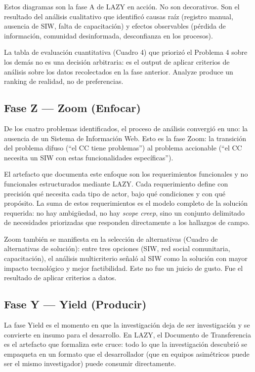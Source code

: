 \documentclass[14pt,a4paper,oneside]{extbook}
\begin{document}
Estos diagramas son la fase A de LAZY en acción. No son decorativos. Son el resultado del análisis cualitativo que identificó causas raíz (registro manual, ausencia de SIW, falta de capacitación) y efectos observables (pérdida de información, comunidad desinformada, desconfianza en los procesos).

La tabla de evaluación cuantitativa (Cuadro 4) que priorizó el Problema 4 sobre los demás no es una decisión arbitraria: es el output de aplicar criterios de análisis sobre los datos recolectados en la fase anterior. Analyze produce un ranking de realidad, no de preferencias.



\subsection{Fase Z — Zoom (Enfocar)}

De los cuatro problemas identificados, el proceso de análisis convergió en uno: la ausencia de un Sistema de Información Web. Esto es la fase Zoom: la transición del problema difuso (\enquote{el CC tiene problemas}) al problema accionable (\enquote{el CC necesita un SIW con estas funcionalidades específicas}).

El artefacto que documenta este enfoque son los requerimientos funcionales y no funcionales estructurados mediante LAZY. Cada requerimiento define con precisión qué necesita cada tipo de actor, bajo qué condiciones y con qué propósito. La suma de estos requerimientos es el modelo completo de la solución requerida: no hay ambigüedad, no hay \textit{scope creep}, sino un conjunto delimitado de necesidades priorizadas que responden directamente a los hallazgos de campo.

Zoom también se manifiesta en la selección de alternativas (Cuadro de alternativas de solución): entre tres opciones (SIW, red social comunitaria, capacitación), el análisis multicriterio señaló al SIW como la solución con mayor impacto tecnológico y mejor factibilidad. Este no fue un juicio de gusto. Fue el resultado de aplicar criterios a datos.



\subsection{Fase Y — Yield (Producir)}

La fase Yield es el momento en que la investigación deja de ser investigación y se convierte en insumo para el desarrollo. En LAZY, el Documento de Transferencia es el artefacto que formaliza este cruce: todo lo que la investigación descubrió se empaqueta en un formato que el desarrollador (que en equipos asimétricos puede ser el mismo investigador) puede consumir directamente.
\end{document}
